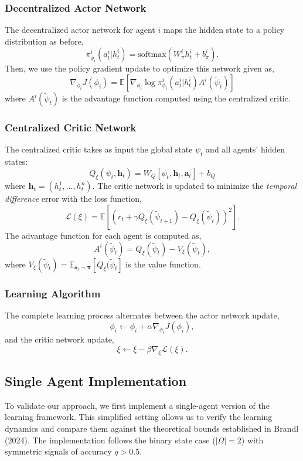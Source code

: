 \subsubsection*{Decentralized Actor Network}
The decentralized actor network for agent $i$ maps the hidden state to a policy distribution as before,
\[
    \pi^i_{\phi_i}(a^i_t|h^i_t) = \text{softmax}(W^i_{\pi}h^i_t + b^i_{\pi}).
\]
Then, we use the policy gradient update to optimize this network given as,
\[
    \nabla_{\phi_i} J(\phi_i) = \mathbb{E}\left[\nabla_{\phi_i} \log \pi^i_{\phi_i}(a^i_t|h^i_t) A^i(\tilde{\psi}_t)\right]
\]
where $A^i(\tilde{\psi}_t)$ is the advantage function computed using the centralized critic.

\subsubsection*{Centralized Critic Network}

The centralized critic takes as input the global state $\psi_t$ and all agents' hidden states:
\[
    Q_{\xi}(\psi_t, \mathbf{h}_t) = W_Q[\psi_t, \mathbf{h}_t, \mathbf{a}_t] + b_Q
\]
where $\mathbf{h}_t = (h^1_t, \ldots, h^n_t)$. The critic network is updated to minimize the \textit{temporal difference} error with the loss function,
\[
    \mathcal{L}(\xi) = \mathbb{E}\left[(r_t + \gamma Q_{\xi}(\tilde{\psi}_{t+1}) - Q_{\xi}(\tilde{\psi}_t))^2\right].
\]
The advantage function for each agent is computed as,
\[
    A^i(\tilde{\psi}_t) = Q_{\xi}(\tilde{\psi}_t) - V_{\xi}(\tilde{\psi}_t),
\]
where $V_{\xi}(\tilde{\psi}_t) = \mathbb{E}_{\mathbf{a}_t \sim \boldsymbol{\pi}}[Q_{\xi}(\tilde{\psi}_t]$ is the value function.


\subsubsection*{Learning Algorithm}
The complete learning process alternates between the actor network update,
\[
    \phi_i \leftarrow \phi_i + \alpha \nabla_{\phi_i} J(\phi_i),
\]
and the critic network update,
\[
    \xi \leftarrow \xi - \beta \nabla_{\xi} \mathcal{L}(\xi).
\]

\subsection*{Single Agent Implementation}

To validate our approach, we first implement a single-agent version of the learning framework. This simplified setting allows us to verify the learning dynamics and compare them against the theoretical bounds established in Brandl (2024). The implementation follows the binary state case ($|\Omega| = 2$) with symmetric signals of accuracy $q > 0.5$.

